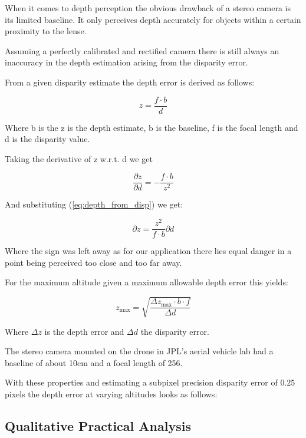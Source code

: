 When it comes to depth perception the obvious drawback of a stereo camera is its limited baseline. It only perceives depth accurately for objects within a certain proximity to the lense. 

Assuming a perfectly calibrated and rectified camera there is still always an inaccuracy in the depth estimation arising from the disparity error.

From a given disparity estimate the depth error is derived as follows:

\begin{equation}\label{eq:depth_from_disp}
    z = \frac{f \cdot b}{d}
\end{equation}

Where b is the z is the depth estimate, b is the baseline, f is the focal length and d is the disparity value.

Taking the derivative of z w.r.t. d we get

\begin{equation}
    \frac{\partial z}{\partial d} = - \frac{f  \cdot b}{z^2}
\end{equation}

And substituting (\cref{eq:depth_from_disp}) we get:

\begin{equation}
    {\partial z} = \frac{z^2}{f  \cdot b}\partial d
\end{equation}

Where the sign was left away as for our application there lies equal danger in a point being perceived too close and too far away.

For the maximum altitude given a maximum allowable depth error this yields:

\begin{equation}
    z_{\text{max}} = \sqrt{\frac{\Delta z_{\text{max}} \cdot b \cdot f}{\Delta d}}
\end{equation}

Where $\Delta z$ is the depth error and $\Delta d$ the disparity error.

The stereo camera mounted on the drone in JPL's aerial vehicle lab had a baseline of about 10cm and a focal length of 256.

With these properties and estimating a subpixel precision disparity error of 0.25 pixels the depth error at varying altitudes looks as follows:




\subsection{Qualitative Practical Analysis}




